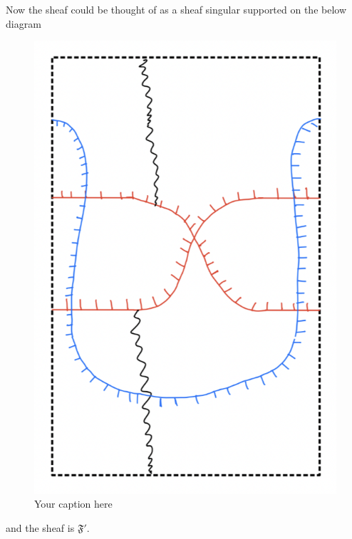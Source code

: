 Now the sheaf could be thought of as a sheaf singular supported on the below diagram
\begin{figure}[H] %
    \centering
    \includegraphics[scale = 0.95]{diagrams/lemma10/14.png} %
    \caption{Your caption here}
    \label{fig:your-label}
\end{figure}

and the sheaf is $\mathfrak{F}'$.

